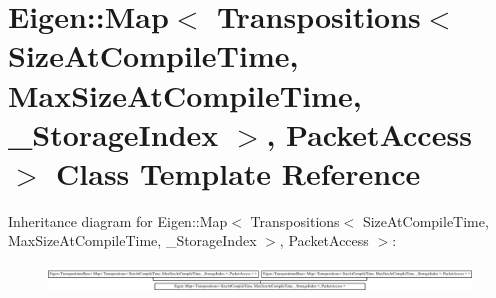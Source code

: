 \hypertarget{class_eigen_1_1_map_3_01_transpositions_3_01_size_at_compile_time_00_01_max_size_at_compile_timecc993082d7c0ba51ca94b27e97da8dd3}{}\section{Eigen\+:\+:Map$<$ Transpositions$<$ Size\+At\+Compile\+Time, Max\+Size\+At\+Compile\+Time, \+\_\+\+Storage\+Index $>$, Packet\+Access $>$ Class Template Reference}
\label{class_eigen_1_1_map_3_01_transpositions_3_01_size_at_compile_time_00_01_max_size_at_compile_timecc993082d7c0ba51ca94b27e97da8dd3}
Inheritance diagram for Eigen\+:\+:Map$<$ Transpositions$<$ Size\+At\+Compile\+Time, Max\+Size\+At\+Compile\+Time, \+\_\+\+Storage\+Index $>$, Packet\+Access $>$\+:\begin{figure}[H]
\begin{center}
\leavevmode
\includegraphics[height=0.726329cm]{class_eigen_1_1_map_3_01_transpositions_3_01_size_at_compile_time_00_01_max_size_at_compile_timecc993082d7c0ba51ca94b27e97da8dd3}
\end{center}
\end{figure}
